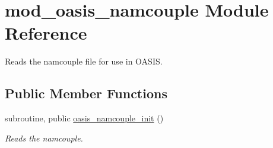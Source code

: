 \hypertarget{classmod__oasis__namcouple}{\section{mod\+\_\+oasis\+\_\+namcouple Module Reference}
\label{classmod__oasis__namcouple}
}


Reads the namcouple file for use in O\+A\+S\+I\+S.  


\subsection*{Public Member Functions}
\begin{DoxyCompactItemize}
\item 
subroutine, public \hyperlink{classmod__oasis__namcouple_ab57c69ae534734f92a85e24a3389e972}{oasis\+\_\+namcouple\+\_\+init} ()
\begin{DoxyCompactList}\small\item\em Reads the namcouple. \end{DoxyCompactList}\end{DoxyCompactItemize}
